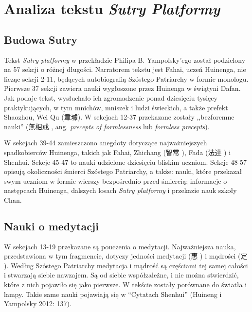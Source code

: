 \chapter{Analiza tekstu \textit{Sutry Platformy}}

\section{Budowa Sutry}
Tekst \textit{Sutry platformy} w przekładzie Philipa B. Yampolsky'ego został podzielony na 57 sekcji o różnej długości. Narratorem tekstu jest Fahai, uczeń Huinenga, nie licząc sekcji 2-11, będących autobiografią Szóstego Patriarchy w formie monologu. Pierwsze 37 sekcji zawiera nauki wygłoszone przez Huinenga w świątyni Dafan. Jak podaje tekst, wysłuchało ich zgromadzenie ponad dziesięciu tysięcy praktykujących, w tym mnichów, mniszek i ludzi świeckich, a także prefekt Shaozhou, Wei Qu (韋璩). W sekcjach 12-37 przekazane zostały ,,bezforemne nauki'' (無相戒 , ang. \textit{precepts of formlessness} lub \textit{formless precepts}).

W sekcjach 39-44 zamieszczono anegdoty dotyczące najważniejszych spadkobierców Huinenga, takich jak Fahai, Zhichang (智常 ), Fada (法達 ) i Shenhui. Sekcje 45-47 to nauki udzielone dziesięciu bliskim uczniom. Sekcje 48-57 opisują okoliczności śmierci Szóstego Patriarchy, a także: nauki, które przekazał swym uczniom w formie wierszy bezpośrednio przed śmiercią; informacje o następcach Huinenga, dalszych losach \textit{Sutry platformy} i przekazie nauk szkoły Chan.

\section{Nauki o medytacji}
W sekcjach 13-19 przekazane są pouczenia o medytacji. Najważniejsza nauka, przedstawiona w tym fragmencie, dotyczy jedności medytacji (惠 ) i mądrości (定 ).\label{DingHui}
Według Szóstego Patriarchy medytacja i mądrość są częściami tej samej całości i stwarzają siebie nawzajem.
Są od siebie współzależne, i nie można stwierdzić, które z nich pojawiło się jako pierwsze. W tekście zostały porównane do światła i lampy. Takie same nauki pojawiają się w ``Cytatach Shenhui''
(Huineng i Yampolsky 2012: 137).

